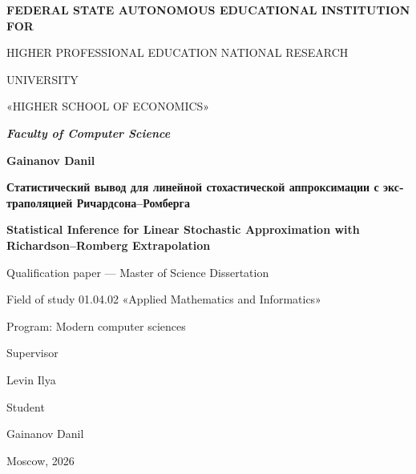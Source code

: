 \documentclass[11pt,a4paper,oneside]{report}
\newcommand{\cyrillicfont}{}
\numberwithin{equation}{chapter}
\begin{document}
\hypersetup{pageanchor=false}

\begin{titlepage}
  \thispagestyle{empty}
  \centering
  {\bfseries\large
  FEDERAL STATE AUTONOMOUS EDUCATIONAL INSTITUTION FOR\par
  HIGHER PROFESSIONAL EDUCATION NATIONAL RESEARCH\par
  UNIVERSITY\par
  «HIGHER SCHOOL OF ECONOMICS»\par}

  \vspace{0.5em}
  {\bfseries\itshape Faculty of Computer Science\par}

  \vspace{2em}
  {\bfseries Gainanov Danil\par}

  \vspace{0.8em}
  {\bfseries\foreignlanguage{russian}{\cyrillicfont Статистический вывод для линейной
  стохастической аппроксимации с экстраполяцией
  Ричардсона--Ромберга}\par}

  \vspace{0.8em}
  {\bfseries Statistical Inference for Linear Stochastic Approximation with
  Richardson--Romberg Extrapolation\par}

  \vspace{1em}
  Qualification paper --- Master of Science Dissertation\par
  Field of study 01.04.02 «Applied Mathematics and Informatics»\par
  Program: Modern computer sciences\par

  \vspace{3.2em}
  \begin{flushright}
    \begin{minipage}{4.6cm}\centering
      Supervisor\par\vspace{1em}Levin Ilya
    \end{minipage}

    \vspace{1.8em}
    \begin{minipage}{4.6cm}\centering
      Student\par\vspace{1em}Gainanov Danil
    \end{minipage}
  \end{flushright}

  \vfill
  Moscow, 2026
\end{titlepage}
\end{document}
